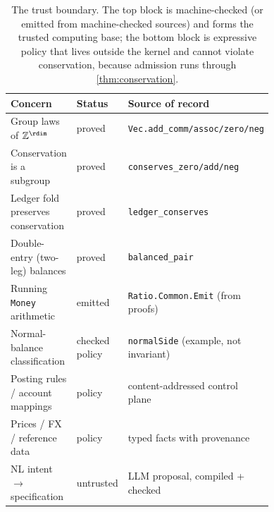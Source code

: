 \begin{table}[t]
\centering
\renewcommand{\arraystretch}{1.25}
\begin{tabular}{@{}p{0.40\linewidth} l p{0.34\linewidth}@{}}
\toprule
\textbf{Concern} & \textbf{Status} & \textbf{Source of record} \\
\midrule
Group laws of $\mathbb{Z}^{\rdim}$            & proved   & \texttt{Vec.add\_comm/assoc/zero/neg} \\
Conservation is a subgroup                   & proved   & \texttt{conserves\_zero/add/neg} \\
Ledger fold preserves conservation           & proved   & \texttt{ledger\_conserves} \\
Double-entry (two-leg) balances              & proved   & \texttt{balanced\_pair} \\
Running \texttt{Money} arithmetic            & emitted  & \texttt{Ratio.Common.Emit} (from proofs) \\
\midrule
Normal-balance classification                & checked policy & \texttt{normalSide} (example, not invariant) \\
Posting rules / account mappings             & policy   & content-addressed control plane \\
Prices / FX / reference data                 & policy   & typed facts with provenance \\
NL intent $\to$ specification                 & untrusted & LLM proposal, compiled + checked \\
\bottomrule
\end{tabular}
\caption{The trust boundary. The top block is machine-checked (or emitted
from machine-checked sources) and forms the trusted computing base; the
bottom block is expressive policy that lives outside the kernel and cannot
violate conservation, because admission runs through
\cref{thm:conservation}.}
\label{tab:trust}
\end{table}
